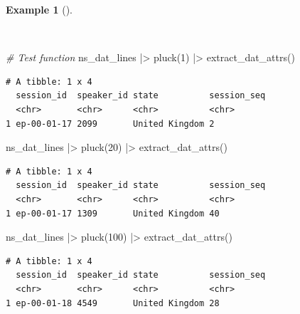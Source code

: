 \documentclass[
  letterpaper,
]{latex/krantz}
\newenvironment{Shaded}{\begin{snugshade}}{\end{snugshade}}
\newcommand{\CommentTok}[1]{\textcolor[rgb]{0.00,0.00,0.00}{\textit{#1}}}
\newcommand{\DecValTok}[1]{\textcolor[rgb]{0.00,0.00,0.00}{#1}}
\newcommand{\FunctionTok}[1]{\textcolor[rgb]{0.00,0.00,0.00}{#1}}
\newcommand{\NormalTok}[1]{\textcolor[rgb]{0.00,0.00,0.00}{#1}}
\newcommand{\SpecialCharTok}[1]{\textcolor[rgb]{0.00,0.00,0.00}{#1}}
\theoremstyle{definition}
\newtheorem{example}{Example}[chapter]
\theoremstyle{remark}
\begin{document}
\begin{example}[]\protect\hypertarget{exm-curate-enntt-test-extract-attributes-function}{}\label{exm-curate-enntt-test-extract-attributes-function}

~

\begin{Shaded}
\begin{Highlighting}[]
\CommentTok{\# Test function}
\NormalTok{ns\_dat\_lines }\SpecialCharTok{|\textgreater{}} \FunctionTok{pluck}\NormalTok{(}\DecValTok{1}\NormalTok{) }\SpecialCharTok{|\textgreater{}} \FunctionTok{extract\_dat\_attrs}\NormalTok{()}
\end{Highlighting}
\end{Shaded}

\begin{verbatim}
# A tibble: 1 x 4
  session_id  speaker_id state          session_seq
  <chr>       <chr>      <chr>          <chr>      
1 ep-00-01-17 2099       United Kingdom 2          
\end{verbatim}

\begin{Shaded}
\begin{Highlighting}[]
\NormalTok{ns\_dat\_lines }\SpecialCharTok{|\textgreater{}} \FunctionTok{pluck}\NormalTok{(}\DecValTok{20}\NormalTok{) }\SpecialCharTok{|\textgreater{}} \FunctionTok{extract\_dat\_attrs}\NormalTok{()}
\end{Highlighting}
\end{Shaded}

\begin{verbatim}
# A tibble: 1 x 4
  session_id  speaker_id state          session_seq
  <chr>       <chr>      <chr>          <chr>      
1 ep-00-01-17 1309       United Kingdom 40         
\end{verbatim}

\begin{Shaded}
\begin{Highlighting}[]
\NormalTok{ns\_dat\_lines }\SpecialCharTok{|\textgreater{}} \FunctionTok{pluck}\NormalTok{(}\DecValTok{100}\NormalTok{) }\SpecialCharTok{|\textgreater{}} \FunctionTok{extract\_dat\_attrs}\NormalTok{()}
\end{Highlighting}
\end{Shaded}

\begin{verbatim}
# A tibble: 1 x 4
  session_id  speaker_id state          session_seq
  <chr>       <chr>      <chr>          <chr>      
1 ep-00-01-18 4549       United Kingdom 28         
\end{verbatim}

\end{example}
\end{document}
